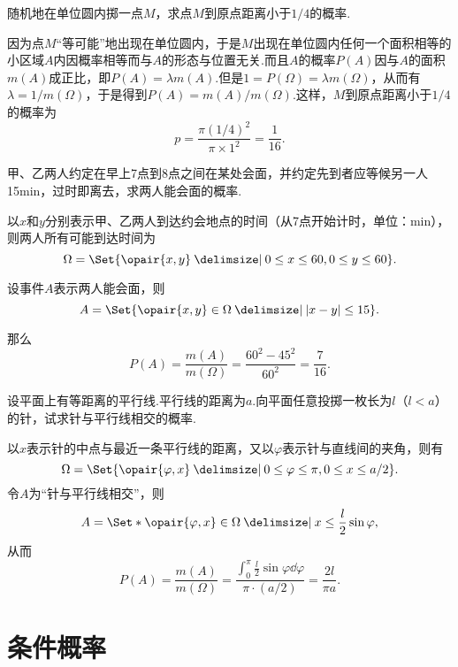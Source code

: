 \begin{example}
随机地在单位圆内掷一点\(M\)，求点\(M\)到原点距离小于\(1/4\)的概率.
\begin{solution}
因为点\(M\)“等可能”地出现在单位圆内，于是\(M\)出现在单位圆内任何一个面积相等的小区域\(A\)内因概率相等而与\(A\)的形态与位置无关.而且\(A\)的概率\(P(A)\)因与\(A\)的面积\(m(A)\)成正比，即\(P(A)=\lambda m(A)\).但是\(1 = P(\Omega) = \lambda m(\Omega)\)，从而有\(\lambda = 1/m(\Omega)\)，于是得到\(P(A) = m(A)/m(\Omega)\).这样，\(M\)到原点距离小于\(1/4\)的概率为\[
p = \frac{\pi (1/4)^2}{\pi \times 1^2} = \frac{1}{16}.
\]
\end{solution}
\end{example}

\begin{example}[会面问题]
甲、乙两人约定在早上7点到8点之间在某处会面，并约定先到者应等候另一人15min，过时即离去，求两人能会面的概率.
\begin{solution}
以\(x\)和\(y\)分别表示甲、乙两人到达约会地点的时间（从7点开始计时，单位：min），则两人所有可能到达时间为\[
\Omega = \Set{ \opair{x,y} \given 0 \leq x \leq 60, 0 \leq y \leq 60 }.
\]

设事件\(A\)表示两人能会面，则\[
A = \Set{ \opair{x,y}\in\Omega \given \abs{x-y} \leq 15 }.
\]

那么\[
P(A) = \frac{m(A)}{m(\Omega)} = \frac{60^2 - 45^2}{60^2} = \frac{7}{16}.
\]
\end{solution}
\end{example}

\begin{example}[布冯投针问题]
设平面上有等距离的平行线.平行线的距离为\(a\).向平面任意投掷一枚长为\(l\)（\(l<a\)）的针，试求针与平行线相交的概率.
\begin{solution}
以\(x\)表示针的中点与最近一条平行线的距离，又以\(\varphi\)表示针与直线间的夹角，则有\[
\Omega = \Set{ \opair{\varphi,x} \given 0 \leq \varphi \leq \pi, 0 \leq x \leq a/2 }.
\]令\(A\)为“针与平行线相交”，则\[
A = \Set*{ \opair{\varphi,x}\in\Omega \given x \leq \frac{l}{2} \sin\varphi },
\]从而\[
P(A) = \frac{m(A)}{m(\Omega)} = \frac{\int_0^{\pi}\frac{l}{2} \sin\varphi \dd{\varphi}}{\pi \cdot (a/2)} = \frac{2l}{\pi a}.
\]
\end{solution}
\end{example}

\section{条件概率}

